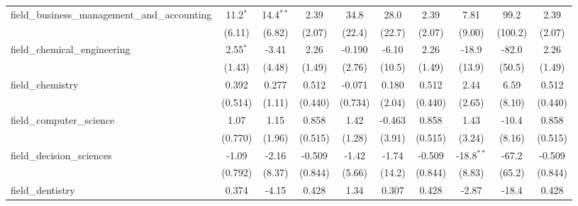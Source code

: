 \begin{tabular}{lccccccccc}
   field\_business\_management\_and\_accounting                & 11.2$^{*}$    & 14.4$^{**}$   & 2.39           & 34.8          & 28.0         & 2.39           & 7.81         & 99.2         & 2.39\\   
                                                               & (6.11)        & (6.82)        & (2.07)         & (22.4)        & (22.7)       & (2.07)         & (9.00)       & (100.2)      & (2.07)\\   
   field\_chemical\_engineering                                & 2.55$^{*}$    & -3.41         & 2.26           & -0.190        & -6.10        & 2.26           & -18.9        & -82.0        & 2.26\\   
                                                               & (1.43)        & (4.48)        & (1.49)         & (2.76)        & (10.5)       & (1.49)         & (13.9)       & (50.5)       & (1.49)\\   
   field\_chemistry                                            & 0.392         & 0.277         & 0.512          & -0.071        & 0.180        & 0.512          & 2.44         & 6.59         & 0.512\\   
                                                               & (0.514)       & (1.11)        & (0.440)        & (0.734)       & (2.04)       & (0.440)        & (2.65)       & (8.10)       & (0.440)\\   
   field\_computer\_science                                    & 1.07          & 1.15          & 0.858          & 1.42          & -0.463       & 0.858          & 1.43         & -10.4        & 0.858\\   
                                                               & (0.770)       & (1.96)        & (0.515)        & (1.28)        & (3.91)       & (0.515)        & (3.24)       & (8.16)       & (0.515)\\   
   field\_decision\_sciences                                   & -1.09         & -2.16         & -0.509         & -1.42         & -1.74        & -0.509         & -18.8$^{**}$ & -67.2        & -0.509\\   
                                                               & (0.792)       & (8.37)        & (0.844)        & (5.66)        & (14.2)       & (0.844)        & (8.83)       & (65.2)       & (0.844)\\   
   field\_dentistry                                            & 0.374         & -4.15         & 0.428          & 1.34          & 0.307        & 0.428          & -2.87        & -18.4        & 0.428\\   

\end{tabular}
